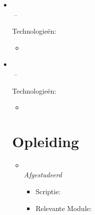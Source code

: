 \documentclass[11pt,a4paper]{article}
\begin{document}
\begin{itemize}[leftmargin=0pt,label={},itemsep=2em,topsep=0pt]
\item \parbox{\textwidth}{\textbf{\HSBCNameNL} \hfill \textit{\HSBCLocationNL}}\\
\textit{\HSBCJobTitleNL} \hfill \textit{\HSBCJobStartNL\,--\,\HSBCJobEndNL}

\vspace{0.2cm}
{\color{secondary}Technologieën:} \HSBCTechnologyNL
\vspace{0.3cm}
\begin{itemize}[leftmargin=*,topsep=-6pt,parsep=0pt,partopsep=0pt,itemsep=0pt]
    \item \HSBCShortNL
\end{itemize}


\item \parbox{\textwidth}{\textbf{\LloydsNameNL} \hfill \textit{\LloydsLocationNL}}\\
\textit{\LloydsJobTitleNL} \hfill \textit{\LloydsJobStartNL\,--\,\LloydsJobEndNL}

\vspace{0.2cm}
{\color{secondary}Technologieën:} \LloydsTechnologyNL
\vspace{0.3cm}
\begin{itemize}[leftmargin=*,topsep=-6pt,parsep=0pt,partopsep=0pt,itemsep=0pt]
    \item \LloydsShortNL
\end{itemize}



\vspace{0.5cm}
\section{Opleiding}
\begin{itemize}[leftmargin=0pt,label={},itemsep=2em]
\item \parbox{\textwidth}{\textbf{\MasterUniversityNL} \hfill \textit{\MasterLocationNL}}\\
\textit{\MasterCourseNL} \hfill \textit{Afgestudeerd \MasterGraduationNL}\\[4pt]

\begin{itemize}[label={--},leftmargin=*,topsep=0pt,parsep=0pt,partopsep=0pt]
    \item {\color{secondary}Scriptie:} \textit{\MastersThesisTitleNL}\\
    \MastersThesisDescriptionNL
    \item {\color{secondary}Relevante Module:} \textit{\MastersNotableJavaModuleNL}\\
\end{itemize}


\end{itemize}
\end{itemize}
\end{document}
